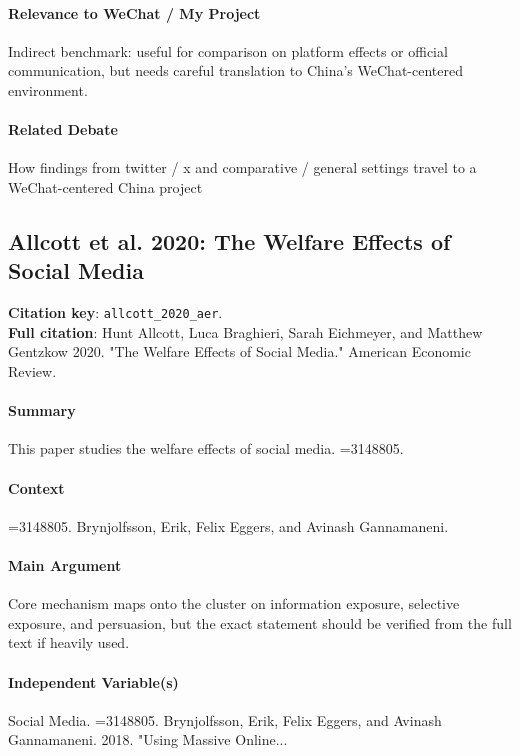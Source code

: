 \documentclass[12pt]{article}
\begin{document}
\paragraph{Relevance to WeChat / My Project} Indirect benchmark: useful for comparison on platform effects or official communication, but needs careful translation to China's WeChat-centered environment.

\paragraph{Related Debate} How findings from twitter / x and comparative / general settings travel to a WeChat-centered China project


\subsection{Allcott et al. 2020: The Welfare Effects of Social Media}
\textbf{Citation key}: \texttt{allcott\_2020\_aer}.\\
\textbf{Full citation}: Hunt Allcott, Luca Braghieri, Sarah Eichmeyer, and Matthew Gentzkow 2020. "The Welfare Effects of Social Media." American Economic Review.

\paragraph{Summary} This paper studies the welfare effects of social media. =3148805.

\paragraph{Context} =3148805. Brynjolfsson, Erik, Felix Eggers, and Avinash Gannamaneni.

\paragraph{Main Argument} Core mechanism maps onto the cluster on information exposure, selective exposure, and persuasion, but the exact statement should be verified from the full text if heavily used.

\paragraph{Independent Variable(s)} Social Media. =3148805. Brynjolfsson, Erik, Felix Eggers, and Avinash Gannamaneni. 2018. "Using Massive Online...
\end{document}
